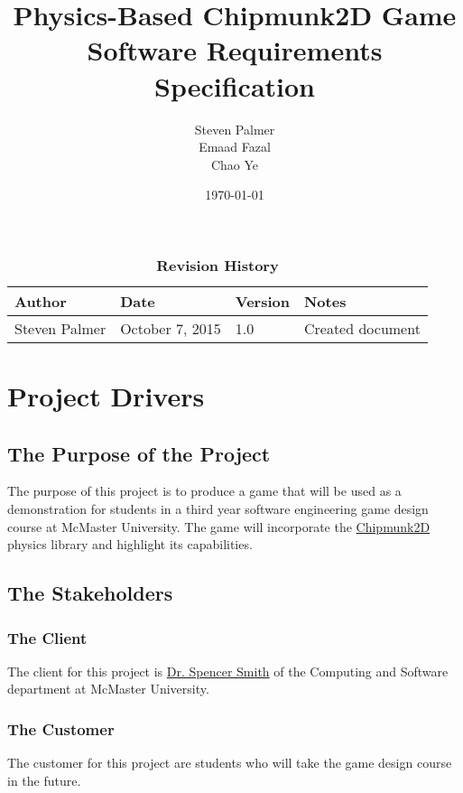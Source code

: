 \documentclass[12pt, titlepage]{article}
\begin{document}
\title{\bf Physics-Based Chipmunk2D Game\\[\baselineskip]\Large Software Requirements Specification}
\author{Steven Palmer\\Emaad Fazal\\Chao Ye}
\date{\today}
	
\maketitle

\tableofcontents
\listoftables

\begin{table}[bp]
\caption*{\bf Revision History}
\begin{tabularx}{\textwidth}{p{3cm}p{3cm}p{2cm}X}
\toprule {\bf Author} & {\bf Date} & {\bf Version} & {\bf Notes}\\
\midrule
Steven Palmer & October 7, 2015 & 1.0 & Created document\\ 
\bottomrule
\end{tabularx}
\end{table}

\newpage
{}
\section{Project Drivers}
\subsection{The Purpose of the Project}
The purpose of this project is to produce a game that will be used as a demonstration for students in a third year software engineering game design course at McMaster University.  The game will incorporate the \href{https://chipmunk-physics.net/}{Chipmunk2D} physics library and highlight its capabilities.
\subsection{The Stakeholders}
\subsubsection{The Client}
The client for this project is \href{http://www.cas.mcmaster.ca/~smiths/}{Dr. Spencer Smith} of the Computing and Software department at McMaster University.
\subsubsection{The Customer}
The customer for this project are students who will take the game design course in the future.
\end{document}
